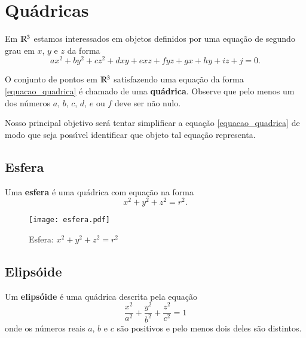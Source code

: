 
\chapter{Qu\'adricas} %
\label{cha:quadricas}

Em $\mathbb{R}^3$ estamos interessados em objetos definidos por uma equa\c{c}\~ao de segundo grau em $x$, $y$ e $z$ da forma
\begin{equation}\label{equacao_quadrica}
	ax^2 + by^2 + cz^2 + dxy + exz + fyz + gx + hy + iz + j = 0.
\end{equation}

O conjunto de pontos em $\mathbb{R}^3$ satisfazendo uma equa\c{c}\~ao da forma \eqref{equacao_quadrica} \'e chamado de uma \textbf{qu\'adrica}. Observe que pelo menos um dos n\'umeros $a$, $b$, $c$, $d$, $e$ ou $f$ deve ser n\~ao nulo.

Nosso principal objetivo ser\'a tentar simplificar a equa\c{c}\~ao \eqref{equacao_quadrica} de modo que seja poss{\'\i}vel identificar que objeto tal equa\c{c}\~ao representa.


\section{Esfera} %
\label{sec:esfera}
\begin{definicao}
	Uma \textbf{esfera} \'e uma qu\'adrica com equa\c{c}\~ao na forma
	\begin{equation}\label{equacao_esfera}
		x^2 + y^2 + z^2 = r^2.
	\end{equation}
\end{definicao}

\begin{figure}[!h]
	\centering
	\caption{Esfera: $x^2 + y^2 + z^2 = r^2$}
	\texttt{[image: esfera.pdf]}
\end{figure}

\section{Elips\'oide} %
\label{sec:elipsoide}
\begin{definicao}
	Um \textbf{elips\'oide} \'e uma qu\'adrica descrita pela equa\c{c}\~ao
	\begin{equation}\label{equacao_elipsoide}
		\dfrac{x^2}{a^2} + \dfrac{y^2}{b^2} + \dfrac{z^2}{c^2} = 1
	\end{equation}
	onde os n\'umeros reais $a$, $b$ e $c$ s\~ao positivos e pelo menos dois deles s\~ao distintos.
\end{definicao}

